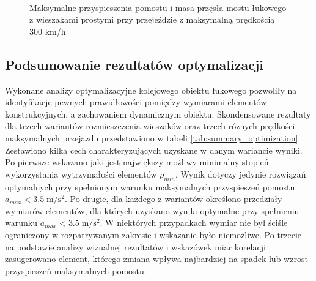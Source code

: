 \begin{figure}[hbt!]
	\centering
	\\
	\captionsetup{justification=centering}
	\caption{Maksymalne przyspieszenia pomostu i masa przęsła mostu łukowego z wieszakami prostymi przy przejeździe z maksymalną prędkością 300 km/h}
	\label{fig:wk2_opti_netw_300_var_dom}
\end{figure}





\pagebreak[4]

\subsection{Podsumowanie rezultatów optymalizacji}

Wykonane analizy optymalizacyjne kolejowego obiektu łukowego pozwoliły na identyfikację pewnych prawidłowości pomiędzy wymiarami elementów konstrukcyjnych, a zachowaniem dynamicznym obiektu. Skondensowane rezultaty dla trzech wariantów rozmieszczenia wieszaków oraz trzech różnych prędkości maksymalnych przejazdu przedstawiono w tabeli \ref{tab:summary_optimization}. Zestawiono kilka cech charakteryzujących uzyskane w danym wariancie wyniki. Po pierwsze wskazano jaki jest największy możliwy minimalny stopień wykorzystania wytrzymałości elementów $\rho_{min}$. Wynik dotyczy jedynie rozwiązań optymalnych przy spełnionym warunku maksymalnych przyspieszeń pomostu $a_{max}<3.5\;\mathrm{m/s^2}$. Po drugie, dla każdego z wariantów określono przedziały wymiarów elementów, dla których uzyskano wyniki optymalne przy spełnieniu warunku $a_{max}<3.5\;\mathrm{m/s^2}$. W niektórych przypadkach wymiar nie był ściśle ograniczony w rozpatrywanym zakresie i wskazanie było niemożliwe. Po trzecie na podstawie analizy wizualnej rezultatów i wskazówek miar korelacji zasugerowano element, którego zmiana  wpływa najbardziej na spadek lub wzrost przyspieszeń maksymalnych pomostu. 

